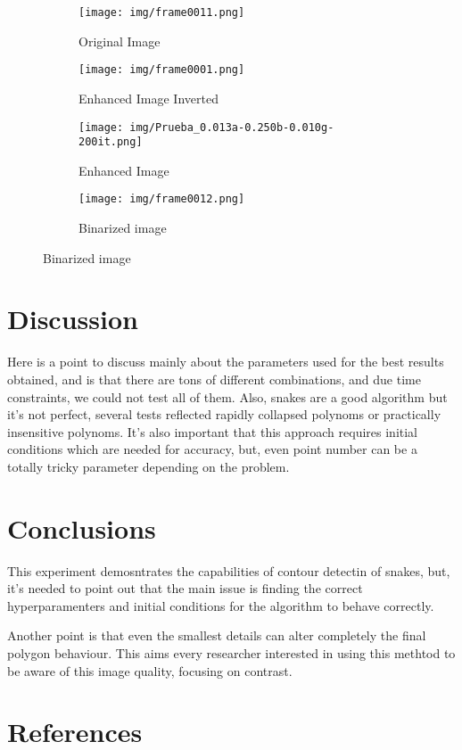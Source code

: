 \documentclass[10pt]{IEEEtran}
\begin{document}
  \begin{figure}[!h]
    \caption{Results}
    \label{fig:results}
    \centering
    \begin{subfigure}{0.4\linewidth}
      \centering
      \texttt{[image: img/frame0011.png]}
      \caption{Original Image}
    \end{subfigure}
    \hfill
    \begin{subfigure}{0.4\linewidth}
      \centering
      \texttt{[image: img/frame0001.png]}
      \caption{Enhanced Image Inverted}
    \end{subfigure}
    \begin{subfigure}{0.4\linewidth}
      \centering
      \texttt{[image: img/Prueba\_0.013a-0.250b-0.010g-200it.png]}
      \caption{Enhanced Image}
    \end{subfigure}
    \hfill
    \begin{subfigure}{0.4\linewidth}
      \centering
      \texttt{[image: img/frame0012.png]}
      \caption{Binarized image}
    \end{subfigure}
  \end{figure}

  \section{Discussion}
  
  Here is a point to discuss mainly about the parameters used for the best results obtained, 
  and is that there are tons of different combinations, and due time constraints, we could not
  test all of them.
  Also, snakes are a good algorithm but it's not perfect, several tests reflected rapidly collapsed
  polynoms or practically insensitive polynoms.
  It's also important that this approach requires initial conditions which are needed for accuracy, 
  but, even point number can be a totally tricky parameter depending on the problem.

  \section{Conclusions}
  This experiment demosntrates the capabilities of contour detectin of snakes, but, it's needed
  to point out that the main issue is finding the correct hyperparamenters and initial conditions
  for the algorithm to behave correctly.

  Another point is that even the smallest details can alter completely the final polygon behaviour.
  This aims every researcher interested in using this methtod to be aware of this image quality,
  focusing on contrast.

  \section*{References}
  
  
\end{document}
